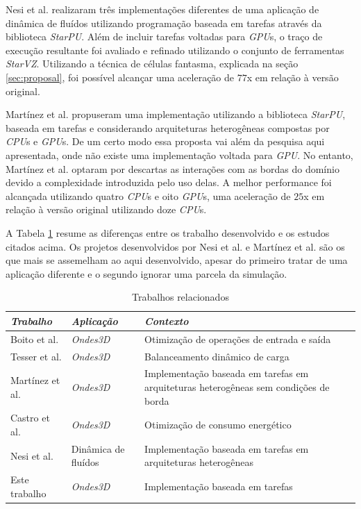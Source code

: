 \documentclass[cic,tc]{iiufrgs}
\begin{document}
Nesi et al. \cite{nesi} realizaram três implementações diferentes de uma aplicação de dinâmica de fluídos utilizando programação baseada em tarefas através da biblioteca \textit{StarPU}.
Além de incluir tarefas voltadas para \textit{GPU}s, o traço de execução resultante foi avaliado e refinado utilizando o conjunto de ferramentas \textit{StarVZ}. Utilizando a técnica de
células fantasma, explicada na seção \ref{sec:proposal}, foi possível alcançar uma aceleração de $77$x em relação à versão original.

Martínez et al. \cite{victor} propuseram uma implementação utilizando a biblioteca \textit{StarPU}, baseada em tarefas e considerando arquiteturas heterogêneas compostas por
\textit{CPU}s e \textit{GPU}s. De um certo modo essa proposta vai além da pesquisa aqui apresentada, onde não existe uma implementação voltada para \textit{GPU}. No entanto, Martínez et al.
optaram por descartas as interações com as bordas do domínio devido a complexidade introduzida pelo uso delas. A melhor performance foi alcançada utilizando quatro \textit{CPU}s e oito
\textit{GPU}s, uma aceleração de $25$x em relação à versão original utilizando doze \textit{CPU}s.


A Tabela \ref{tbl:related_works} resume as diferenças entre os trabalho desenvolvido e os estudos citados acima. Os projetos desenvolvidos por Nesi et al. e Martínez et al. são
os que mais se assemelham ao aqui desenvolvido, apesar do primeiro tratar de uma aplicação diferente e o segundo ignorar uma parcela da simulação.

\begin{table}[htb!]
    \caption{Trabalhos relacionados}
    \begin{center}
        \begin{tabular}{l|l|p{60mm}}
            \textit{Trabalho} & \textit{Aplicação} & \textit{Contexto} \\
            \hline
            \hline
            Boito et al.    & \textit{Ondes3D} & Otimização de operações de entrada e saída \\
            Tesser et al.   & \textit{Ondes3D} & Balanceamento dinâmico de carga             \\
            Martínez et al. & \textit{Ondes3D} & Implementação baseada em tarefas em arquiteturas heterogêneas sem condições de borda             \\
            Castro et al.   & \textit{Ondes3D} & Otimização de consumo energético             \\
            Nesi et al.     & Dinâmica de fluídos & Implementação baseada em tarefas em arquiteturas heterogêneas \\
            Este trabalho   & \textit{Ondes3D} & Implementação baseada em tarefas             \\
            \hline
        \end{tabular}
    \end{center}
    \label{tbl:related_works}
\end{table}
\end{document}
